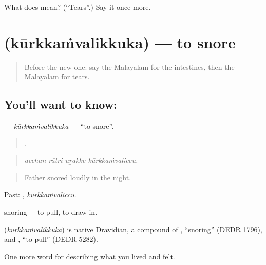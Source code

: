 \begin{tcolorbox}[breakable,colback=teal!4,colframe=teal!35!black,title={Before you move on}]
What does  mean? (\textquotedblleft{}Tears\textquotedblright{}.) Say it once more.
\end{tcolorbox}
\section[\texorpdfstring{\ml{കൂർക്കംവലിക്കുക} (kūrkkaṁvalikkuka)}{കൂർക്കംവലിക്കുക (kūrkkaṁvalikkuka)}]{ (kūrkkaṁvalikkuka) — to snore}

\label{lesson:ML-C537-kurkkamvalikkuka}



\begin{quote}
Before the new one: say the Malayalam for the intestines, then the Malayalam for tears.
\end{quote}

\subsection*{You'll want to know: }
\textbf{} — \emph{kūrkkaṁvalikkuka} — \textquotedblleft{}to snore\textquotedblright{}.

\begin{quote}
   .
\end{quote}

\begin{quote}
\emph{acchan rātri uṟakke kūrkkaṁvaliccu.}
\end{quote}

\begin{quote}
Father snored loudly in the night.
\end{quote}

Past: , \emph{kūrkkaṁvaliccu}.

 snoring +  to pull, to draw in.

\begin{cousinweb}
\textbf{} (\emph{kūrkkaṁvalikkuka}) is native Dravidian, a compound of , \textquotedblleft{}snoring\textquotedblright{} (DEDR 1796), and , \textquotedblleft{}to pull\textquotedblright{} (DEDR 5282).
\end{cousinweb}

\begin{grammarlens}[title={What you've built}]
One more word for describing what you lived and felt.
\end{grammarlens}

